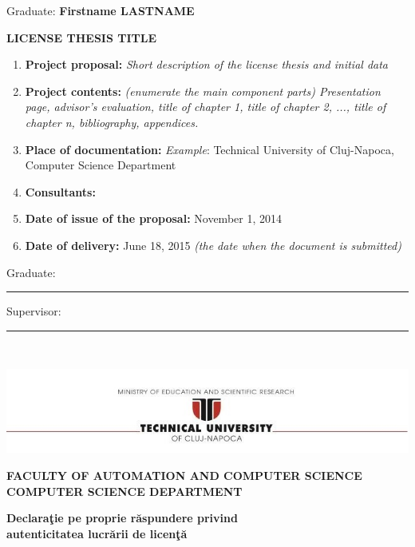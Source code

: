 \documentclass[12pt,a4paper,twoside]{report}
\renewcommand{\thesisauthor}{Firstname LASTNAME}    %
\renewcommand{\thesistitle}{LICENSE THESIS TITLE}
\newcommand{\department}{\bf FACULTY OF AUTOMATION AND COMPUTER SCIENCE\\
COMPUTER SCIENCE DEPARTMENT}
\newcommand{\utcnlogo}{\includegraphics[width=15cm]{img/tucn.jpg}}
\newcommand{\uline}[1]{\rule[0pt]{#1}{0.4pt}}
\begin{document}
\vspace{2cm}

\begin{center}
Graduate: {\bf \thesisauthor}

\vspace{1cm}

{\bf \thesistitle}
\end{center}

\vspace{1cm}

\begin{enumerate}
 \item {\bf Project proposal:} {\it Short description of the license thesis and initial data}
\item {\bf Project contents:} {\it (enumerate the main component parts) Presentation page, advisor's evaluation, title of chapter 1, title of chapter 2, ..., title of chapter n, bibliography, appendices.}
\item {\bf Place of documentation:} {\it Example}: Technical University of Cluj-Napoca, Computer Science Department
\item {\bf Consultants:}
\item {\bf Date of issue of the proposal:} November 1, 2014
\item {\bf Date of  delivery:} June 18, 2015 {\it (the date when the document is submitted)}
  \end{enumerate}
\vspace{1.2cm}

\hspace{6cm} Graduate: \uline{6cm} 

\vspace{0.5cm}
\hspace{6cm} Supervisor: \uline{6cm} 

\thispagestyle{empty}


\newpage
$ $


\thispagestyle{empty}
\newpage

\begin{center}
\utcnlogo

\department
\end{center}

\vspace{0.5cm}

\begin{center}
{\bf
Declara\c{t}ie pe proprie r\u{a}spundere privind\\ 
autenticitatea lucr\u{a}rii de licen\c{t}\u{a}}
\end{center}
\vspace{1cm}
\end{document}

